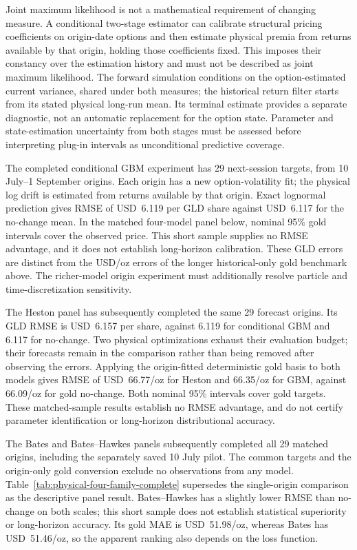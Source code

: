 Joint maximum likelihood is not a mathematical requirement of changing measure.
A conditional two-stage estimator can calibrate structural pricing coefficients
on origin-date options and then estimate physical premia from returns available
by that origin, holding those coefficients fixed. This imposes their constancy
over the estimation history and must not be described as joint maximum likelihood.
The forward simulation conditions on the option-estimated current variance,
shared under both measures; the historical return filter starts from its stated
physical long-run mean. Its terminal estimate provides a separate diagnostic,
not an automatic replacement for the option state. Parameter and state-estimation
uncertainty from both stages must be assessed before interpreting plug-in
intervals as unconditional predictive coverage.

The completed conditional GBM experiment has 29 next-session targets, from
10 July--1 September origins. Each origin has a new option-volatility fit;
the physical log drift is estimated from returns available by that origin.
Exact lognormal prediction gives RMSE of USD~6.119 per GLD share against
USD~6.117 for the no-change mean. In the matched four-model panel below,
\CovBSNinetyFive{} nominal 95\% gold intervals cover the observed price. This short sample supplies no RMSE
advantage, and it does not establish long-horizon calibration. These GLD
errors are distinct from the USD/oz errors of the longer historical-only
gold benchmark above. The richer-model origin experiment must additionally
resolve particle and time-discretization sensitivity.

The Heston panel has subsequently completed the same 29 forecast origins.
Its GLD RMSE is USD~6.157 per share, against 6.119 for conditional GBM and
6.117 for no-change. Two physical optimizations exhaust their evaluation
budget; their forecasts remain in the comparison rather than being removed
after observing the errors. Applying the origin-fitted deterministic gold
basis to both models gives RMSE of USD~66.77/oz for Heston and 66.35/oz for
GBM, against 66.09/oz for gold no-change. Both nominal 95\% intervals cover
\CovHNinetyFive{} gold targets. These matched-sample results establish no RMSE
advantage, and do not certify parameter identification or long-horizon
distributional accuracy.

The Bates and Bates--Hawkes panels subsequently completed all 29 matched
origins, including the separately saved 10 July pilot. The common targets
and the origin-only gold conversion exclude no observations from any model.
Table~\ref{tab:physical-four-family-complete} supersedes the single-origin
comparison as the descriptive panel result. Bates--Hawkes has a slightly
lower RMSE than no-change on both scales; this short sample does not
establish statistical superiority or long-horizon accuracy. Its gold MAE
is USD~51.98/oz, whereas Bates has USD~51.46/oz, so the apparent ranking
also depends on the loss function.

